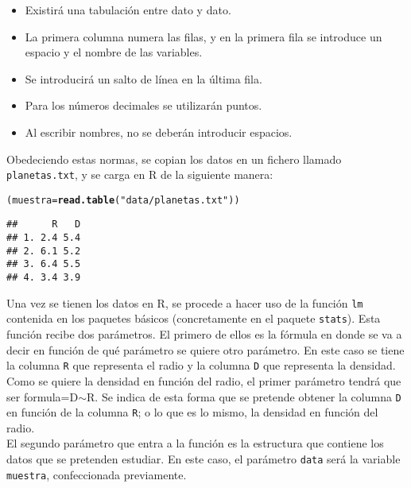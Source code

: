 \documentclass[12pt]{report}\usepackage[]{graphicx}\usepackage[dvipsnames]{xcolor}
\makeatletter
\newcommand{\hlstr}[1]{\textcolor[rgb]{0.192,0.494,0.8}{#1}}%
\newcommand{\hlstd}[1]{\textcolor[rgb]{0.345,0.345,0.345}{#1}}%
\newcommand{\hlkwb}[1]{\textcolor[rgb]{0.69,0.353,0.396}{#1}}%
\newcommand{\hlkwd}[1]{\textcolor[rgb]{0.737,0.353,0.396}{\textbf{#1}}}%
\newenvironment{kframe}{%
 \def\at@end@of@kframe{}%
 \ifinner\ifhmode%
  \def\at@end@of@kframe{\end{minipage}}%
  \begin{minipage}{\columnwidth}%
 \fi\fi%
 \def\FrameCommand##1{\hskip\@totalleftmargin \hskip-\fboxsep
 \colorbox{shadecolor}{##1}\hskip-\fboxsep
     \hskip-\linewidth \hskip-\@totalleftmargin \hskip\columnwidth}%
 \MakeFramed {\advance\hsize-\width
   \@totalleftmargin\z@ \linewidth\hsize
   \@setminipage}}%
 {\par\unskip\endMakeFramed%
 \at@end@of@kframe}
\newenvironment{knitrout}{}{} %
\makeatother
\begin{document}
	\begin{itemize}
		\item Existirá una tabulación entre dato y dato. 
		\item La primera columna numera las filas, y en la primera fila se introduce un espacio y el nombre de las variables. 
		\item Se introducirá un salto de línea en la última fila. 
		\item Para los números decimales se utilizarán puntos. 
		\item Al escribir nombres, no se deberán introducir espacios. 
	\end{itemize}
	
	Obedeciendo estas normas, se copian los datos en un fichero llamado \texttt{planetas.txt}, y se carga en R de la siguiente manera:
	
\begin{knitrout}
\color{fgcolor}\begin{kframe}
\begin{alltt}
\hlstd{(muestra} \hlkwb{=} \hlkwd{read.table}\hlstd{(}\hlstr{"data/planetas.txt"}\hlstd{))}
\end{alltt}
\begin{verbatim}
##      R   D
## 1. 2.4 5.4
## 2. 6.1 5.2
## 3. 6.4 5.5
## 4. 3.4 3.9
\end{verbatim}
\end{kframe}
\end{knitrout}
	
	Una vez se tienen los datos en R, se procede a hacer uso de la función \texttt{lm} contenida en los paquetes básicos (concretamente en el paquete \texttt{stats}). Esta función recibe dos parámetros. El primero de ellos es la fórmula en donde se va a decir en función de qué parámetro se quiere otro parámetro. En este caso se tiene la columna \texttt{R} que representa el radio y la columna \texttt{D} que representa la densidad. Como se quiere la densidad en función del radio, el primer parámetro tendrá que ser formula=D$\sim$R. Se indica de esta forma que se pretende obtener la columna \texttt{D} en función de la columna \texttt{R}; o lo que es lo mismo, la densidad en función del radio.\\
	
	El segundo parámetro que entra a la función es la estructura que contiene los datos que se pretenden estudiar. En este caso, el parámetro \texttt{data} será la variable \texttt{muestra}, confeccionada previamente.\\
	
\end{document}
